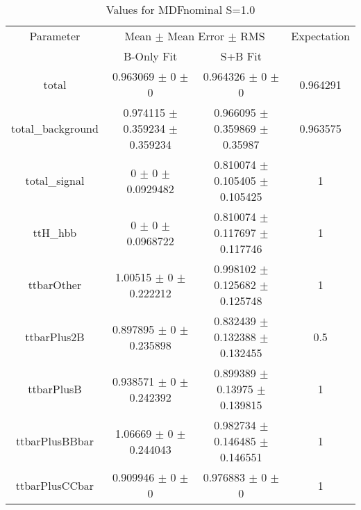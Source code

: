 \begin{table}
\centering
\caption{Values for MDFnominal S=1.0}
\begin{tabular}{cccc}
\toprule
Parameter & \multicolumn{2}{c}{Mean $\pm$ Mean Error $\pm$ RMS} & Expectation\\
 & B-Only Fit & S+B Fit & \\
\midrule
total & \num{0.963069} $\pm$ \num{0} $\pm$ \num{0} & \num{0.964326} $\pm$ \num{0} $\pm$ \num{0} & \num{0.964291}\\
total\_background & \num{0.974115} $\pm$ \num{0.359234} $\pm$ \num{0.359234} & \num{0.966095} $\pm$ \num{0.359869} $\pm$ \num{0.35987} & \num{0.963575}\\
total\_signal & \num{0} $\pm$ \num{0} $\pm$ \num{0.0929482} & \num{0.810074} $\pm$ \num{0.105405} $\pm$ \num{0.105425} & \num{1}\\
ttH\_hbb & \num{0} $\pm$ \num{0} $\pm$ \num{0.0968722} & \num{0.810074} $\pm$ \num{0.117697} $\pm$ \num{0.117746} & \num{1}\\
ttbarOther & \num{1.00515} $\pm$ \num{0} $\pm$ \num{0.222212} & \num{0.998102} $\pm$ \num{0.125682} $\pm$ \num{0.125748} & \num{1}\\
ttbarPlus2B & \num{0.897895} $\pm$ \num{0} $\pm$ \num{0.235898} & \num{0.832439} $\pm$ \num{0.132388} $\pm$ \num{0.132455} & \num{0.5}\\
ttbarPlusB & \num{0.938571} $\pm$ \num{0} $\pm$ \num{0.242392} & \num{0.899389} $\pm$ \num{0.13975} $\pm$ \num{0.139815} & \num{1}\\
ttbarPlusBBbar & \num{1.06669} $\pm$ \num{0} $\pm$ \num{0.244043} & \num{0.982734} $\pm$ \num{0.146485} $\pm$ \num{0.146551} & \num{1}\\
ttbarPlusCCbar & \num{0.909946} $\pm$ \num{0} $\pm$ \num{0} & \num{0.976883} $\pm$ \num{0} $\pm$ \num{0} & \num{1}\\
\bottomrule
\end{tabular}
\end{table}